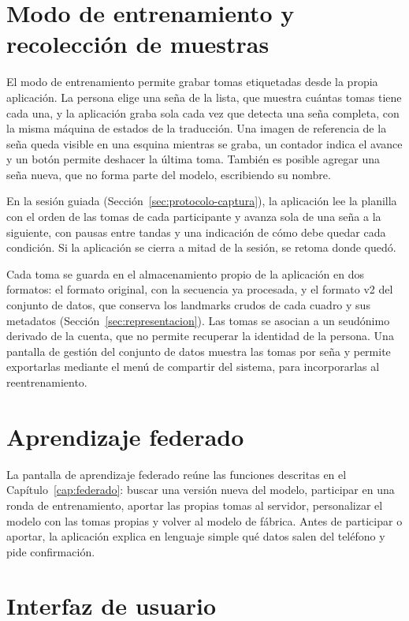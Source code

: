 \section{Modo de entrenamiento y recolección de muestras}

El modo de entrenamiento permite grabar tomas etiquetadas desde la propia aplicación. La persona elige una seña de la lista, que muestra cuántas tomas tiene cada una, y la aplicación graba sola cada vez que detecta una seña completa, con la misma máquina de estados de la traducción. Una imagen de referencia de la seña queda visible en una esquina mientras se graba, un contador indica el avance y un botón permite deshacer la última toma. También es posible agregar una seña nueva, que no forma parte del modelo, escribiendo su nombre.

En la sesión guiada (Sección~\ref{sec:protocolo-captura}), la aplicación lee la planilla con el orden de las tomas de cada participante y avanza sola de una seña a la siguiente, con pausas entre tandas y una indicación de cómo debe quedar cada condición. Si la aplicación se cierra a mitad de la sesión, se retoma donde quedó.

Cada toma se guarda en el almacenamiento propio de la aplicación en dos formatos: el formato original, con la secuencia ya procesada, y el formato v2 del conjunto de datos, que conserva los landmarks crudos de cada cuadro y sus metadatos (Sección~\ref{sec:representacion}). Las tomas se asocian a un seudónimo derivado de la cuenta, que no permite recuperar la identidad de la persona. Una pantalla de gestión del conjunto de datos muestra las tomas por seña y permite exportarlas mediante el menú de compartir del sistema, para incorporarlas al reentrenamiento.

\section{Aprendizaje federado}

La pantalla de aprendizaje federado reúne las funciones descritas en el Capítulo~\ref{cap:federado}: buscar una versión nueva del modelo, participar en una ronda de entrenamiento, aportar las propias tomas al servidor, personalizar el modelo con las tomas propias y volver al modelo de fábrica. Antes de participar o aportar, la aplicación explica en lenguaje simple qué datos salen del teléfono y pide confirmación.

\section{Interfaz de usuario}

